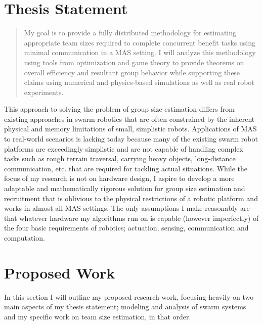 \documentclass[11pt, onecolumn, compsoc, letterpaper]{article}
\begin{document}
\section{Thesis Statement}
\begin{quote}
My goal is to provide a fully distributed methodology for estimating appropriate team sizes required to complete concurrent benefit tasks using minimal communication in a MAS setting. I will analyze this methodology using tools from optimization and game theory to provide theorems on overall efficiency and resultant group behavior while supporting these claims using numerical and physics-based simulations as well as real robot experiments.
\end{quote}

This approach to solving the problem of group size estimation differs from existing approaches in swarm robotics that are often constrained by the inherent physical and memory limitations of small, simplistic robots. Applications of MAS to real-world scenarios is lacking today because many of the existing swarm robot platforms are exceedingly simplistic and are not capable of handling complex tasks such as rough terrain traversal, carrying heavy objects, long-distance communication, etc. that are required for tackling actual situations. While the focus of my research is not on hardware design, I aspire to develop a more adaptable and mathematically rigorous solution for group size estimation and recruitment that is oblivious to the physical restrictions of a robotic platform and works in almost all MAS settings. The only assumptions I make reasonably are that whatever hardware my algorithms run on is capable (however imperfectly) of the four basic requirements of robotics; actuation, sensing, communication and computation.

\section{Proposed Work}
In this section I will outline my proposed research work, focusing heavily on two main aspects of my thesis statement; modeling and analysis of swarm systems and my specific work on team size estimation, in that order.
\end{document}
